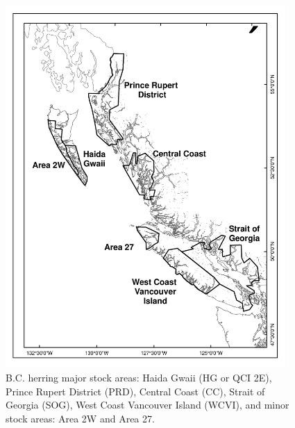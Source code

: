 \begin{figure}[!tbp]
	\includegraphics[width=0.95\textwidth]{../FIGS/PBSfigs/Assessment_Regions_2W_27_2010_HG.pdf}
	\caption{B.C. herring major stock areas: Haida Gwaii (HG or QCI 2E), Prince Rupert District (PRD), Central
Coast (CC), Strait of Georgia (SOG), West Coast Vancouver Island (WCVI), and minor stock areas: Area 2W and
Area 27.}\label{II:fig:map}
\end{figure}